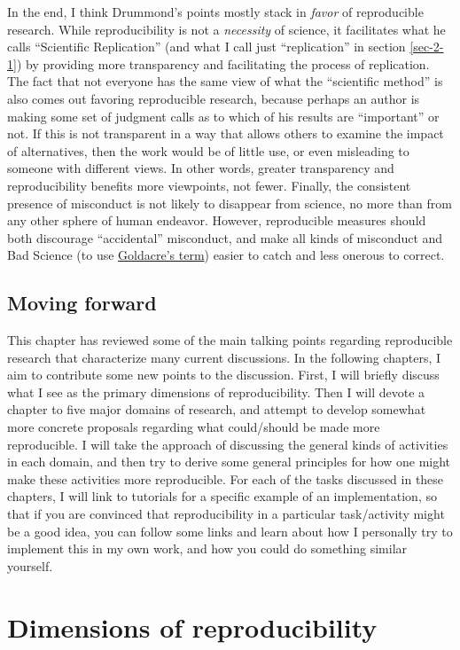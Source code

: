 \documentclass{book}
\begin{document}
In the end, I think Drummond's points mostly stack in \emph{favor} of reproducible research. While reproducibility is not a \emph{necessity} of science, it facilitates what he calls ``Scientific Replication'' (and what I call just ``replication'' in section \ref{sec-2-1}) by providing more transparency and facilitating the process of replication. The fact that not everyone has the same view of what the ``scientific method'' is also comes out favoring reproducible research, because perhaps an author is making some set of judgment calls as to which of his results are ``important'' or not. If this is not transparent in a way that allows others to examine the impact of alternatives, then the work would be of little use, or even misleading to someone with different views. In other words, greater transparency and reproducibility benefits more viewpoints, not fewer. Finally, the consistent presence of misconduct is not likely to disappear from science, no more than from any other sphere of human endeavor. However, reproducible measures should both discourage ``accidental'' misconduct, and make all kinds of misconduct and Bad Science (to use \href{http://www.badscience.net/}{Goldacre's term}) easier to catch and less onerous to correct.
\section{Moving forward}
\label{sec-2-5}

This chapter has reviewed some of the main talking points regarding reproducible research that characterize many current discussions. In the following chapters, I aim to contribute some new points to the discussion. First, I will briefly discuss what I see as the primary dimensions of reproducibility. Then I will devote a chapter to five major domains of research, and attempt to develop somewhat more concrete proposals regarding what could/should be made more reproducible. I will take the approach of discussing the general kinds of activities in each domain, and then try to derive some general principles for how one might make these activities more reproducible.  For each of the tasks discussed in these chapters, I will link to tutorials for a specific example of an implementation, so that if you are convinced that reproducibility in a particular task/activity might be a good idea, you can follow some links and learn about how I personally try to implement this in my own work, and how you could do something similar yourself.
\chapter{Dimensions of reproducibility}
\label{sec-3}
\label{dimensions}
\end{document}
